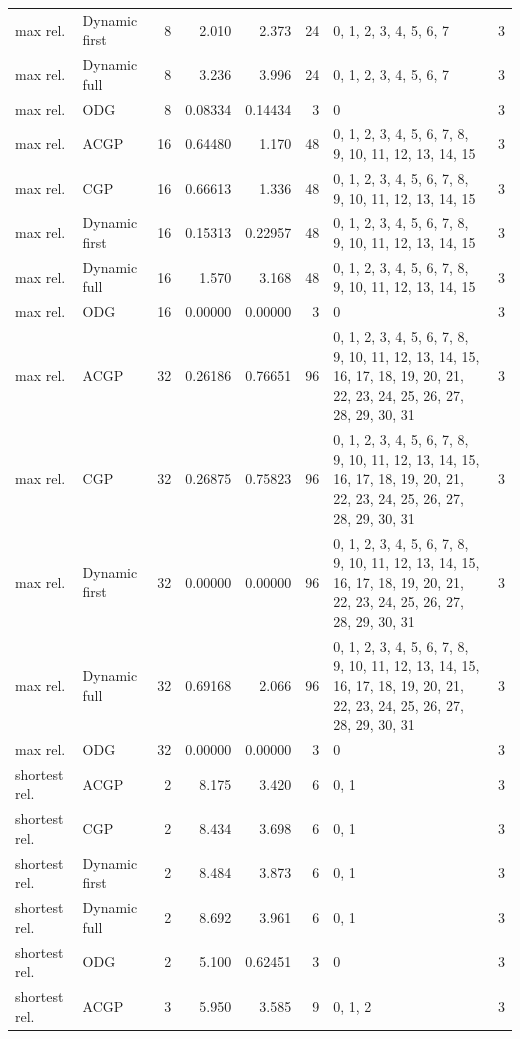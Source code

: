 \documentclass[10pt,a4paper]{article}
\begin{document}
\begin{longtable}{@{}p{23mm}p{29mm}rrrrp{36mm}r@{}}
max rel. & Dynamic first & 8 & 2.010 & 2.373 & 24 & 0, 1, 2, 3, 4, 5, 6, 7 & 3 \\
max rel. & Dynamic full & 8 & 3.236 & 3.996 & 24 & 0, 1, 2, 3, 4, 5, 6, 7 & 3 \\
max rel. & ODG & 8 & 0.08334 & 0.14434 & 3 & 0 & 3 \\
max rel. & ACGP & 16 & 0.64480 & 1.170 & 48 & 0, 1, 2, 3, 4, 5, 6, 7, 8, 9, 10, 11, 12, 13, 14, 15 & 3 \\
max rel. & CGP & 16 & 0.66613 & 1.336 & 48 & 0, 1, 2, 3, 4, 5, 6, 7, 8, 9, 10, 11, 12, 13, 14, 15 & 3 \\
max rel. & Dynamic first & 16 & 0.15313 & 0.22957 & 48 & 0, 1, 2, 3, 4, 5, 6, 7, 8, 9, 10, 11, 12, 13, 14, 15 & 3 \\
max rel. & Dynamic full & 16 & 1.570 & 3.168 & 48 & 0, 1, 2, 3, 4, 5, 6, 7, 8, 9, 10, 11, 12, 13, 14, 15 & 3 \\
max rel. & ODG & 16 & 0.00000 & 0.00000 & 3 & 0 & 3 \\
max rel. & ACGP & 32 & 0.26186 & 0.76651 & 96 & 0, 1, 2, 3, 4, 5, 6, 7, 8, 9, 10, 11, 12, 13, 14, 15, 16, 17, 18, 19, 20, 21, 22, 23, 24, 25, 26, 27, 28, 29, 30, 31 & 3 \\
max rel. & CGP & 32 & 0.26875 & 0.75823 & 96 & 0, 1, 2, 3, 4, 5, 6, 7, 8, 9, 10, 11, 12, 13, 14, 15, 16, 17, 18, 19, 20, 21, 22, 23, 24, 25, 26, 27, 28, 29, 30, 31 & 3 \\
max rel. & Dynamic first & 32 & 0.00000 & 0.00000 & 96 & 0, 1, 2, 3, 4, 5, 6, 7, 8, 9, 10, 11, 12, 13, 14, 15, 16, 17, 18, 19, 20, 21, 22, 23, 24, 25, 26, 27, 28, 29, 30, 31 & 3 \\
max rel. & Dynamic full & 32 & 0.69168 & 2.066 & 96 & 0, 1, 2, 3, 4, 5, 6, 7, 8, 9, 10, 11, 12, 13, 14, 15, 16, 17, 18, 19, 20, 21, 22, 23, 24, 25, 26, 27, 28, 29, 30, 31 & 3 \\
max rel. & ODG & 32 & 0.00000 & 0.00000 & 3 & 0 & 3 \\
shortest rel. & ACGP & 2 & 8.175 & 3.420 & 6 & 0, 1 & 3 \\
shortest rel. & CGP & 2 & 8.434 & 3.698 & 6 & 0, 1 & 3 \\
shortest rel. & Dynamic first & 2 & 8.484 & 3.873 & 6 & 0, 1 & 3 \\
shortest rel. & Dynamic full & 2 & 8.692 & 3.961 & 6 & 0, 1 & 3 \\
shortest rel. & ODG & 2 & 5.100 & 0.62451 & 3 & 0 & 3 \\
shortest rel. & ACGP & 3 & 5.950 & 3.585 & 9 & 0, 1, 2 & 3 \\

\end{longtable}
\end{document}

